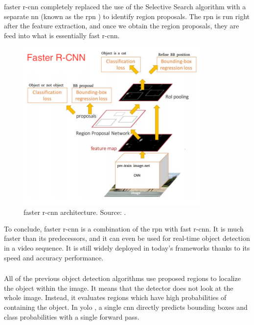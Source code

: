             \Gls{faster r-cnn} completely replaced the use of the Selective Search algorithm with a separate \gls{nn} (known as the \gls{rpn} \cite{ren2015faster}) to identify region proposals. The \gls{rpn} is run right after the feature extraction, and once we obtain the region proposals, they are feed into what is essentially \gls{fast r-cnn}.

            \begin{figure}[ht]
                \centering
                \includegraphics[width=0.85\textwidth]{resources/faster_r_cnn_architecture.png}
                \caption{\Gls{faster r-cnn} architecture. Source: \cite{xuobjectdetection}.}
                \label{fig:faster r-cnn architecture}
            \end{figure}
            
            To conclude, \gls{faster r-cnn} is a combination of the \gls{rpn} with \gls{fast r-cnn}. It is much faster than its predecessors, and it can even be used for real-time object detection in a video sequence. It is still widely deployed in today's frameworks thanks to its speed and accuracy performance.
            
        \subsubsection{}
            All of the previous object detection algorithms use proposed regions to localize the object within the image. It means that the detector does not look at the whole image. Instead, it evaluates regions which have high probabilities of containing the object. In \gls{yolo} \cite{redmon2016you}, a single \gls{cnn} directly predicts bounding boxes and class probabilities with a single forward pass.
            
